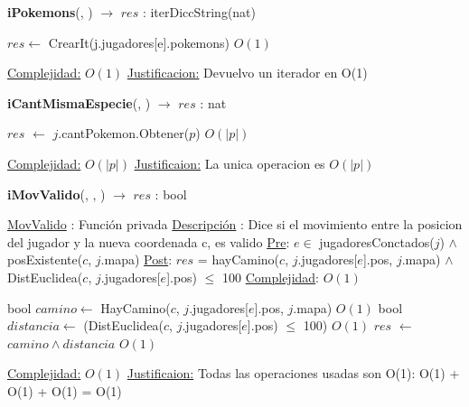 \begin{Algoritmos}

\begin{algorithm}[H]
{\textbf{iPokemons}(, ) $\to$ $res$ : iterDiccString(nat)}
\begin{algorithmic}[1]

\State $res \gets $ CrearIt(j.jugadores[e].pokemons) \Comment $O(1)$

\medskip
\State \underline{Complejidad:} $O(1)$
\State \underline{Justificacion:} Devuelvo un iterador en O(1)

\end{algorithmic}
\end{algorithm}



\begin{algorithm}[H]
{\textbf{iCantMismaEspecie}(, ) $\to$ $res$ : nat}
\begin{algorithmic}[1]

\State $res$ $\gets$ $j$.cantPokemon.Obtener($p$)  \Comment $O(|p|)$

\medskip
\Statex \underline{Complejidad:} $O(|p|)$
\Statex \underline{Justificaion:} La unica operacion es $O(|p|)$

\end{algorithmic}
\end{algorithm}  



\begin{algorithm}[H]
{\textbf{iMovValido}(, , ) $\to$ $res$ : bool}
\begin{algorithmic}[1]

\Statex \underline{MovValido} : Funci\'on privada 
\Statex \underline{Descripci\'on} : Dice si el movimiento entre la posicion del jugador y la nueva coordenada c, es valido 
\Statex \underline{Pre}: $e \in$ jugadoresConctados($j$) $\land$ posExistente($c$, $j$.mapa) 
\Statex \underline{Post}: $res$ = hayCamino($c$, $j$.jugadores[$e$].pos, $j$.mapa) $\land$ 
\Statex $ $\hspace*{2cm} DistEuclidea($c$, $j$.jugadores[$e$].pos) $\leq$ 100
\Statex \underline{Complejidad}: $O(1)$ 

\State bool $camino \gets$ HayCamino($c$, $j$.jugadores[$e$].pos, $j$.mapa) \Comment $O(1)$
\State bool $distancia \gets$ (DistEuclidea($c$, $j$.jugadores[$e$].pos) $\leq$ 100) \Comment $O(1)$
\State $res$ $\gets$ $camino \land distancia$ \Comment $O(1)$

\medskip
\Statex \underline{Complejidad:} $O(1)$
\Statex \underline{Justificaion:} Todas las operaciones usadas son O(1): O(1) + O(1) + O(1) = O(1)


\end{algorithmic}
\end{algorithm}
\end{Algoritmos}
